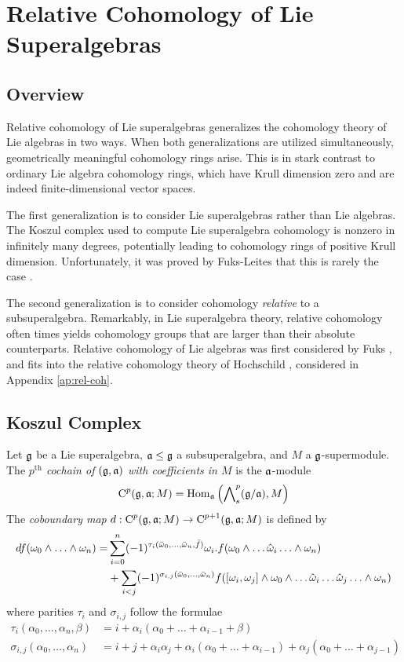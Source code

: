 \chapter{Relative Cohomology of Lie Superalgebras}

\section{Overview}
\label{sec:coh-overview}

Relative cohomology of Lie superalgebras generalizes the cohomology theory of Lie algebras in two ways. When both generalizations are utilized simultaneously, geometrically meaningful cohomology rings arise. This is in stark contrast to ordinary Lie algebra cohomology rings, which have Krull dimension zero and are indeed finite-dimensional vector spaces.

The first generalization is to consider Lie superalgebras rather than Lie algebras. The Koszul complex used to compute Lie superalgebra cohomology is nonzero in infinitely many degrees, potentially leading to cohomology rings of positive Krull dimension. Unfortunately, it was proved by Fuks-Leites that this is rarely the case \cite{fuks-leites}.

The second generalization is to consider cohomology \emph{relative} to a subsuperalgebra. Remarkably, in Lie superalgebra theory, relative cohomology often times yields cohomology groups that are larger than their absolute counterparts. Relative cohomology of Lie algebras was first considered by Fuks \cite{fuks}, and fits into the relative cohomology theory of Hochschild \cite{hochschild}, considered in Appendix \ref{ap:rel-coh}.

\section{Koszul Complex}
\label{sec:koszul}

  Let $\mathfrak{g}$ be a Lie superalgebra, $\mathfrak{a} \leq \mathfrak{g}$ a subsuperalgebra, and $M$ a $\mathfrak{g}$-supermodule. The \emph{$p^\text{th}$ cochain of $(\mathfrak{g},\mathfrak{a})$ with coefficients in $M$} is the $\mathfrak{a}$-module
  \[
    \operatorname{C}^p(\mathfrak{g},\mathfrak{a};M) = \operatorname{Hom}_{\mathfrak{a}}\left( \bigwedge\nolimits^{p}_s(\mathfrak{g}/\mathfrak{a}), M \right)
  \]
  The \emph{coboundary map} $d: \operatorname{C}^p(\mathfrak{g},\mathfrak{a};M) \to \operatorname{C}^{p+1}(\mathfrak{g},\mathfrak{a};M)$ is defined by
\begin{align*}
  df(\omega_0 \wedge \ldots \wedge \omega_n) = &\sum_{i = 0}^n (-1)^{\tau_i(\bar {\omega}_0, \ldots,\bar{\omega}_n,\bar f)} \omega_i .f(\omega_0 \wedge \ldots \hat {\omega}_i \ldots \wedge \omega_n) \\
 &+ \sum_{i < j} (-1)^{\sigma_{i,j}(\bar {\omega}_0, \ldots , \bar {\omega}_n)} f([\omega_i,\omega_j] \wedge \omega_0 \wedge \ldots \hat {\omega}_i \ldots \hat {\omega}_j \ldots \wedge \omega_n)
\end{align*}
where parities $\tau_i$ and $\sigma_{i,j}$ follow the formulae
\begin{align*}
  \tau_i(\alpha_0,\ldots,\alpha_n,\beta) &= i + \alpha_i (\alpha_0 + \ldots + \alpha_{i-1} + \beta)\\
  \sigma_{i,j}(\alpha_0,\ldots,\alpha_n) &= i + j + \alpha_i \alpha_j + \alpha_i(\alpha_0 + \ldots + \alpha_{i-1}) + \alpha_j (\alpha_0 + \ldots + \alpha_{j-1})
\end{align*}

